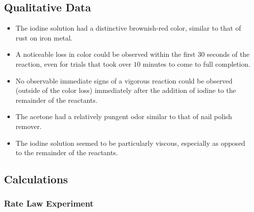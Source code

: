 \subsection{Qualitative Data}
\begin{itemize}[]
	  \item The iodine solution had a distinctive brownish-red color, similar to that of rust on iron metal.
	  \item A noticeable loss in color could be observed within the first $30$ seconds of the reaction, even for trials that took over $10$ minutes to come to full completion.
	  \item No observable immediate signs of a vigorous reaction could be observed (outside of the color loss) immediately after the addition of iodine to the remainder of the reactants.
	  \item The acetone had a relatively pungent odor similar to that of nail polish remover.
	  \item The iodine solution seemed to be particularly viscous, especially as opposed to the remainder of the reactants.
	\end{itemize}

\subsection{Calculations}

\subsubsection{Rate Law Experiment}

